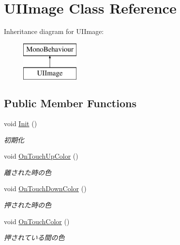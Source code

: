 \hypertarget{class_u_i_image}{}\section{U\+I\+Image Class Reference}
\label{class_u_i_image}
Inheritance diagram for U\+I\+Image\+:\begin{figure}[H]
\begin{center}
\leavevmode
\includegraphics[height=2.000000cm]{class_u_i_image}
\end{center}
\end{figure}
\subsection*{Public Member Functions}
\begin{DoxyCompactItemize}
\item 
void \hyperlink{class_u_i_image_a88eef4b3643e666976c81aa36aa1c943}{Init} ()
\begin{DoxyCompactList}\small\item\em 初期化 \end{DoxyCompactList}\item 
void \hyperlink{class_u_i_image_af72aac7a3a2ab82901302332cf8f9eb4}{On\+Touch\+Up\+Color} ()
\begin{DoxyCompactList}\small\item\em 離された時の色 \end{DoxyCompactList}\item 
void \hyperlink{class_u_i_image_aa51089a52c0b9f9776b5af8ac2704603}{On\+Touch\+Down\+Color} ()
\begin{DoxyCompactList}\small\item\em 押された時の色 \end{DoxyCompactList}\item 
void \hyperlink{class_u_i_image_aa6038f3fb4dc283e367936f1c8f71558}{On\+Touch\+Color} ()
\begin{DoxyCompactList}\small\item\em 押されている間の色 \end{DoxyCompactList}\end{DoxyCompactItemize}
